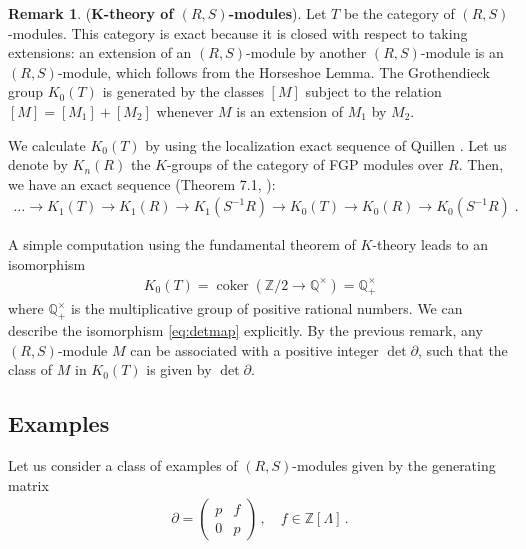 \documentclass[sn-mathphys-num]{sn-jnl}
\theoremstyle{definition}
\newtheorem{remark}[lemma]{Remark}
\numberwithin{equation}{section}
\theoremstyle{definition}
\def\pd{\partial}
\def\IQ{\mathbb{Q}}
\def\IZ{{\mathbb{Z}}}
\def\coker{\operatorname{coker}}
\begin{document}
\begin{remark} \label{remark:ktheory}(\textbf{K-theory of $(R,S)$-modules}). Let $T$ be the category of $(R,S)$-modules. This category is exact because it is closed with respect to taking extensions: an extension of an $(R,S)$-module by another $(R,S)$-module is an $(R,S)$-module, which follows from the Horseshoe Lemma. The Grothendieck group $K_0(T)$ \cite{QuillenHigherK} is generated by the classes $[M]$ subject to the relation $[M]=[M_1]+[M_2]$ whenever $M$ is an extension of $M_1$ by $M_2$.

We calculate  $K_0(T)$ by using the localization exact sequence of Quillen \cite{Grayson}. Let us denote by $K_n(R)$ the $K$-groups of the category of FGP modules over $R$. Then, we have an exact sequence (Theorem 7.1, \cite{Grayson}):
\begin{align}\label{eq:localizationKtheory}
  \ldots \rightarrow  K_1(T) \rightarrow K_1(R)\rightarrow K_1(S^{-1}R)\rightarrow 
  K_0(T) \rightarrow K_0(R)\rightarrow K_0(S^{-1}R)\;.
\end{align}

A simple computation using the fundamental theorem of $K$-theory \cite{KBook} leads to an isomorphism
\begin{align}\label{eq:detmap}
 K_0(T)= \coker (\IZ/2\to \IQ^{\times})= \IQ^{\times}_+   
\end{align}
 where $\IQ^{\times}_+$ is the multiplicative group of positive rational numbers. We can describe the isomorphism \eqref{eq:detmap} explicitly. By the previous remark, any $(R,S)$-module $M$ can be associated with a positive integer $\det \pd$, such that the class of $M$ in $K_0(T)$ is given by $\det \pd$. 
\end{remark}

\subsection{Examples}\label{sec:examples} Let us consider a class of examples of $(R,S)$-modules given by the generating matrix
\begin{align}\label{(2.3)}
    \pd=\begin{pmatrix}
        p & f\\
        0 & p
    \end{pmatrix}\,,\quad f\in \IZ[\Lambda]\,.
\end{align}
\end{document}
